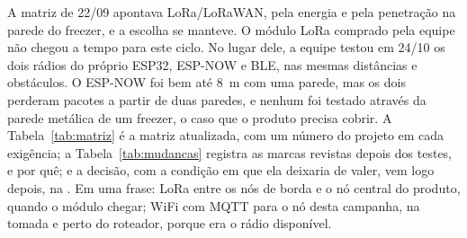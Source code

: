 A matriz de 22/09 apontava LoRa/LoRaWAN, pela energia e pela penetração
na parede do freezer, e a escolha se manteve. O módulo LoRa comprado pela
equipe não chegou a tempo para este ciclo. No lugar dele, a equipe
testou em 24/10 os dois rádios do próprio ESP32, ESP-NOW e BLE, nas
mesmas distâncias e obstáculos. O ESP-NOW foi bem até \SI{8}{\metre} com
uma parede, mas os dois perderam pacotes a partir de duas paredes, e
nenhum foi testado através da parede metálica de um freezer, o caso que
o produto precisa cobrir. A Tabela~\ref{tab:matriz} é a matriz atualizada, com um
número do projeto em cada exigência; a Tabela~\ref{tab:mudancas}
registra as marcas revistas depois dos testes, e por quê; e a decisão,
com a condição em que ela deixaria de valer, vem logo depois, na
. Em uma frase: LoRa entre os nós de borda e o nó central do
produto, quando o módulo chegar; WiFi com MQTT para o nó desta campanha,
na tomada e perto do roteador, porque era o rádio disponível.


